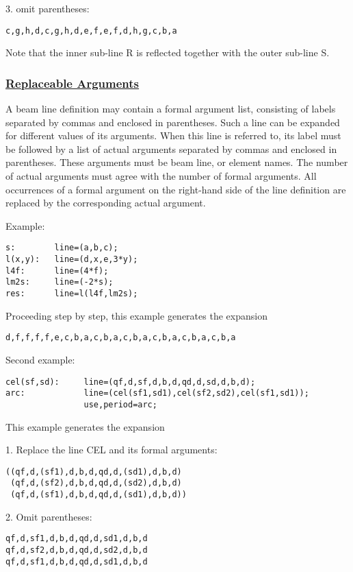 3. omit parentheses: 
\begin{verbatim}
c,g,h,d,c,g,h,d,e,f,e,f,d,h,g,c,b,a
\end{verbatim}  
Note that the inner sub-line R is reflected together with the outer
sub-line S.   

\subsubsection{\href{argument}{Replaceable Arguments}} 
A beam line definition may contain a formal argument list, consisting of
labels separated by commas and enclosed in parentheses. Such a line can
be expanded for different values of its arguments. When this line is
referred to, its label must be followed by a list of actual arguments
separated by commas and enclosed in parentheses. These arguments must be
beam line, or element names. The number of actual arguments must agree
with the number of formal arguments. All occurrences of a formal
argument on the right-hand side of the line definition are replaced by
the corresponding actual argument.  

Example: 
\begin{verbatim}
s:        line=(a,b,c);
l(x,y):   line=(d,x,e,3*y);
l4f:      line=(4*f);
lm2s:     line=(-2*s);
res:      line=l(l4f,lm2s);
\end{verbatim} 

Proceeding step by step, this example generates the expansion 
\begin{verbatim}
d,f,f,f,f,e,c,b,a,c,b,a,c,b,a,c,b,a,c,b,a,c,b,a
\end{verbatim} 

Second example: 
\begin{verbatim}
cel(sf,sd):     line=(qf,d,sf,d,b,d,qd,d,sd,d,b,d);
arc:            line=(cel(sf1,sd1),cel(sf2,sd2),cel(sf1,sd1));
                use,period=arc;
\end{verbatim} 
This example generates the expansion 

 1. Replace the line CEL and its formal arguments: 
\begin{verbatim}
((qf,d,(sf1),d,b,d,qd,d,(sd1),d,b,d)
 (qf,d,(sf2),d,b,d,qd,d,(sd2),d,b,d)
 (qf,d,(sf1),d,b,d,qd,d,(sd1),d,b,d))
\end{verbatim}

 2. Omit parentheses: 
\begin{verbatim}
qf,d,sf1,d,b,d,qd,d,sd1,d,b,d
qf,d,sf2,d,b,d,qd,d,sd2,d,b,d
qf,d,sf1,d,b,d,qd,d,sd1,d,b,d
\end{verbatim}

